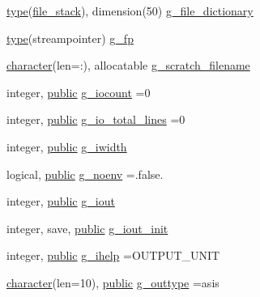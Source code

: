 \begin{DoxyCompactItemize}
\item 
\hyperlink{stop__watch_83_8txt_a70f0ead91c32e25323c03265aa302c1c}{type}(\hyperlink{structm__fpp_1_1file__stack}{file\+\_\+stack}), dimension(50) \hyperlink{namespacem__fpp_a4d652f22f13a938d8b879d2da436e3e7}{g\+\_\+file\+\_\+dictionary}
\item 
\hyperlink{stop__watch_83_8txt_a70f0ead91c32e25323c03265aa302c1c}{type}(streampointer) \hyperlink{namespacem__fpp_a90e1828ada2e3a70200d2172c2ca9ef2}{g\+\_\+fp}
\item 
\hyperlink{option__stopwatch_83_8txt_abd4b21fbbd175834027b5224bfe97e66}{character}(len=\+:), allocatable \hyperlink{namespacem__fpp_a228eed7955304567f03bab1a1b39c4ab}{g\+\_\+scratch\+\_\+filename}
\item 
integer, \hyperlink{M__stopwatch_83_8txt_a2f74811300c361e53b430611a7d1769f}{public} \hyperlink{namespacem__fpp_a4d1d9ddcc7abec412be3a3e6c99b19e1}{g\+\_\+iocount} =0
\item 
integer, \hyperlink{M__stopwatch_83_8txt_a2f74811300c361e53b430611a7d1769f}{public} \hyperlink{namespacem__fpp_ad1a67d3e00b9a0683ba0e10a42d0e588}{g\+\_\+io\+\_\+total\+\_\+lines} =0
\item 
integer, \hyperlink{M__stopwatch_83_8txt_a2f74811300c361e53b430611a7d1769f}{public} \hyperlink{namespacem__fpp_a2dcc2372199e7d3cb6e318948cbd77c0}{g\+\_\+iwidth}
\item 
logical, \hyperlink{M__stopwatch_83_8txt_a2f74811300c361e53b430611a7d1769f}{public} \hyperlink{namespacem__fpp_a495064207d70c0d79f3506fb735d4f07}{g\+\_\+noenv} =.false.
\item 
integer, \hyperlink{M__stopwatch_83_8txt_a2f74811300c361e53b430611a7d1769f}{public} \hyperlink{namespacem__fpp_a741d58e0caef7e3b1aa6e56796d6d705}{g\+\_\+iout}
\item 
integer, save, \hyperlink{M__stopwatch_83_8txt_a2f74811300c361e53b430611a7d1769f}{public} \hyperlink{namespacem__fpp_ac2149360808b5ac936e0cbfa075c0099}{g\+\_\+iout\+\_\+init}
\item 
integer, \hyperlink{M__stopwatch_83_8txt_a2f74811300c361e53b430611a7d1769f}{public} \hyperlink{namespacem__fpp_ae0b89e9d5583b98efa43c34378112eca}{g\+\_\+ihelp} =O\+U\+T\+P\+U\+T\+\_\+\+U\+N\+IT
\item 
\hyperlink{option__stopwatch_83_8txt_abd4b21fbbd175834027b5224bfe97e66}{character}(len=10), \hyperlink{M__stopwatch_83_8txt_a2f74811300c361e53b430611a7d1769f}{public} \hyperlink{namespacem__fpp_aced59ed7cc330b1975f7d89c808273eb}{g\+\_\+outtype} =\textquotesingle{}asis\textquotesingle{}

\end{DoxyCompactItemize}
